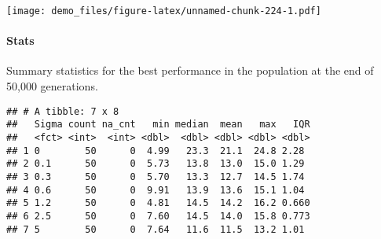 \documentclass[]{book}
\newenvironment{Shaded}{\begin{snugshade}}{\end{snugshade}}
\newcommand{\DataTypeTok}[1]{\textcolor[rgb]{0.13,0.29,0.53}{#1}}
\newcommand{\KeywordTok}[1]{\textcolor[rgb]{0.13,0.29,0.53}{\textbf{#1}}}
\newcommand{\NormalTok}[1]{#1}
\newcommand{\OperatorTok}[1]{\textcolor[rgb]{0.81,0.36,0.00}{\textbf{#1}}}
\newcommand{\OtherTok}[1]{\textcolor[rgb]{0.56,0.35,0.01}{#1}}
\newcommand{\StringTok}[1]{\textcolor[rgb]{0.31,0.60,0.02}{#1}}
\let\oldparagraph\paragraph
\renewcommand{\paragraph}[1]{\oldparagraph{#1}\mbox{}}
\begin{document}
\texttt{[image: demo\_files/figure-latex/unnamed-chunk-224-1.pdf]}

\hypertarget{stats-43}{%
\paragraph{Stats}\label{stats-43}}

Summary statistics for the best performance in the population at the end of 50,000 generations.

\begin{Shaded}
\end{Shaded}

\begin{verbatim}
## # A tibble: 7 x 8
##   Sigma count na_cnt   min median  mean   max   IQR
##   <fct> <int>  <int> <dbl>  <dbl> <dbl> <dbl> <dbl>
## 1 0        50      0  4.99   23.3  21.1  24.8 2.28 
## 2 0.1      50      0  5.73   13.8  13.0  15.0 1.29 
## 3 0.3      50      0  5.70   13.3  12.7  14.5 1.74 
## 4 0.6      50      0  9.91   13.9  13.6  15.1 1.04 
## 5 1.2      50      0  4.81   14.5  14.2  16.2 0.660
## 6 2.5      50      0  7.60   14.5  14.0  15.8 0.773
## 7 5        50      0  7.64   11.6  11.5  13.2 1.01
\end{verbatim}
\end{document}
